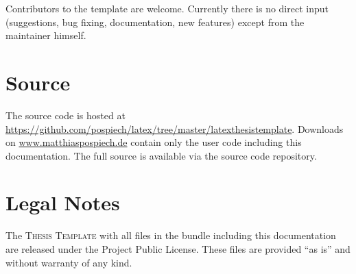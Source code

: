 Contributors to the template are welcome. Currently there is no direct input (suggestions, bug fixing, documentation, new features) except from the maintainer himself.

\section*{Source}
The source code is hosted at \url{https://github.com/pospiech/latex/tree/master/latexthesistemplate}. Downloads on \url{www.matthiaspospiech.de} contain only the user code including this documentation. The full source is available via the source code repository.

\section*{Legal Notes}
The \textsc{\latex Thesis Template} with all files in the bundle including this documentation are released under the \latex Project Public License. These files are provided “as is” and without warranty of any kind.

